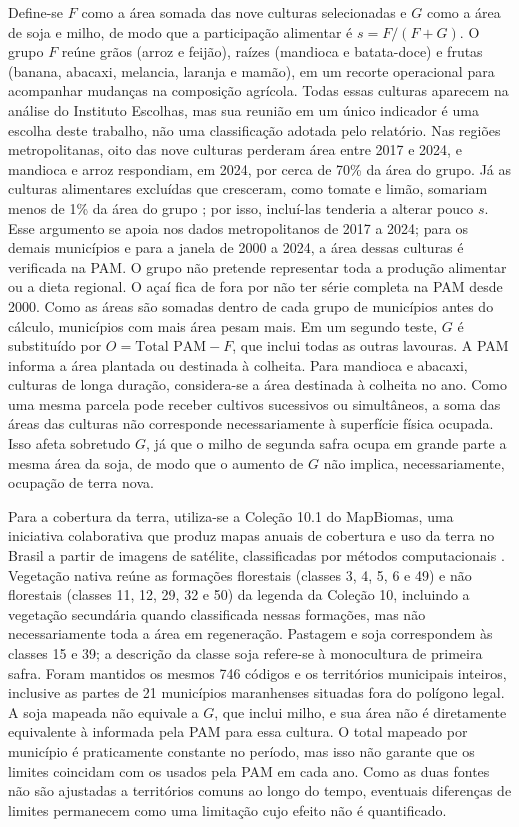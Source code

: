 \documentclass[11pt,a4paper]{article}
\begin{document}
Define-se $F$ como a área somada das nove culturas selecionadas e $G$ como a área de soja e milho, de modo que a participação alimentar é $s = F/(F+G)$. O grupo $F$ reúne grãos (arroz e feijão), raízes (mandioca e batata-doce) e frutas (banana, abacaxi, melancia, laranja e mamão), em um recorte operacional para acompanhar mudanças na composição agrícola. Todas essas culturas aparecem na análise do Instituto Escolhas, mas sua reunião em um único indicador é uma escolha deste trabalho, não uma classificação adotada pelo relatório. Nas regiões metropolitanas, oito das nove culturas perderam área entre 2017 e 2024, e mandioca e arroz respondiam, em 2024, por cerca de 70\% da área do grupo. Já as culturas alimentares excluídas que cresceram, como tomate e limão, somariam menos de 1\% da área do grupo \citep{escolhas2026}; por isso, incluí-las tenderia a alterar pouco $s$. Esse argumento se apoia nos dados metropolitanos de 2017 a 2024; para os demais municípios e para a janela de 2000 a 2024, a área dessas culturas é verificada na PAM. O grupo não pretende representar toda a produção alimentar ou a dieta regional. O açaí fica de fora por não ter série completa na PAM desde 2000. Como as áreas são somadas dentro de cada grupo de municípios antes do cálculo, municípios com mais área pesam mais. Em um segundo teste, $G$ é substituído por $O = \text{Total PAM} - F$, que inclui todas as outras lavouras. A PAM informa a área plantada ou destinada à colheita. Para mandioca e abacaxi, culturas de longa duração, considera-se a área destinada à colheita no ano. Como uma mesma parcela pode receber cultivos sucessivos ou simultâneos, a soma das áreas das culturas não corresponde necessariamente à superfície física ocupada. Isso afeta sobretudo $G$, já que o milho de segunda safra ocupa em grande parte a mesma área da soja, de modo que o aumento de $G$ não implica, necessariamente, ocupação de terra nova.

Para a cobertura da terra, utiliza-se a Coleção 10.1 do MapBiomas, uma iniciativa colaborativa que produz mapas anuais de cobertura e uso da terra no Brasil a partir de imagens de satélite, classificadas por métodos computacionais \citep{mapbiomas2026}. Vegetação nativa reúne as formações florestais (classes 3, 4, 5, 6 e 49) e não florestais (classes 11, 12, 29, 32 e 50) da legenda da Coleção 10, incluindo a vegetação secundária quando classificada nessas formações, mas não necessariamente toda a área em regeneração. Pastagem e soja correspondem às classes 15 e 39; a descrição da classe soja refere-se à monocultura de primeira safra. Foram mantidos os mesmos 746 códigos e os territórios municipais inteiros, inclusive as partes de 21 municípios maranhenses situadas fora do polígono legal. A soja mapeada não equivale a $G$, que inclui milho, e sua área não é diretamente equivalente à informada pela PAM para essa cultura. O total mapeado por município é praticamente constante no período, mas isso não garante que os limites coincidam com os usados pela PAM em cada ano. Como as duas fontes não são ajustadas a territórios comuns ao longo do tempo, eventuais diferenças de limites permanecem como uma limitação cujo efeito não é quantificado.
\end{document}
